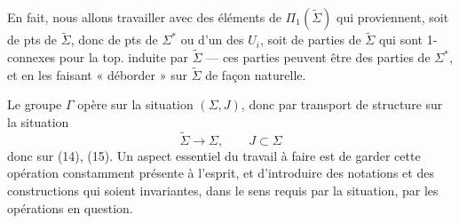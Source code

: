 \documentclass[11pt,a4paper]{article}
\begin{document}
En fait, nous allons travailler avec des éléments de $\Pi_1(\widetilde{\Sigma})$ qui
proviennent, soit de pts de $\widetilde{\Sigma}$, donc de pts de $\Sigma^{*}$ ou d'un des
$U_i$, soit de parties de $\widetilde{\Sigma}$ qui sont 1-connexes pour la top. induite par
$\widetilde{\Sigma}$ — ces parties peuvent être des parties  de
$\Sigma^{*}$, et en les faisant « déborder » sur $\widetilde{\Sigma}$ de façon naturelle.

Le groupe $\Gamma$ opère sur la situation  $(\Sigma, J)$, donc par
transport de structure sur la situation
\[
  \widetilde{\Sigma} \longrightarrow \Sigma, \qquad J \subset \Sigma
\]
donc sur (14), (15). Un aspect essentiel du travail à faire est de garder cette
opération constamment présente à l'esprit, et d'introduire des notations et
des constructions qui soient invariantes, dans le sens requis par la situation, par les
opérations en question.

\end{document}
